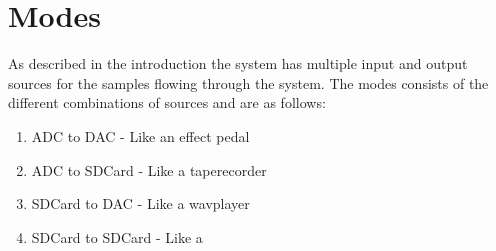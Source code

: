 \section{Modes}

As described in the introduction the system has multiple input and output
sources for the samples flowing through the system. The modes consists of the
different combinations of sources and are as follows:

\begin{enumerate}
\item ADC to DAC - Like an effect pedal
\item ADC to SDCard - Like a taperecorder
\item SDCard to DAC - Like a wavplayer
\item SDCard to SDCard - Like a 
	\label{enum:data_flow_modes}
\end{enumerate}
